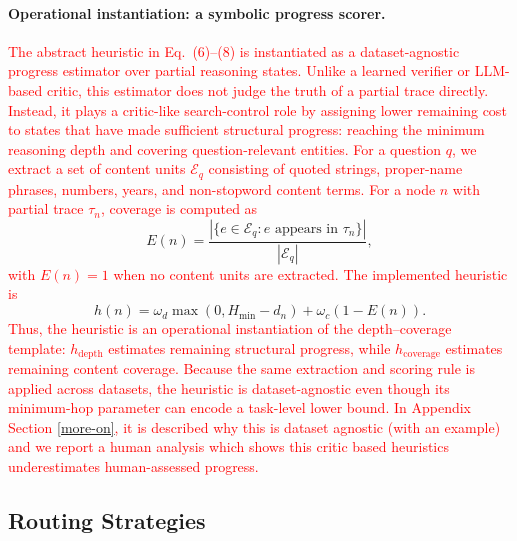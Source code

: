 \documentclass[11pt]{article}
\begin{document}
\paragraph{Operational instantiation: a symbolic progress scorer.}
\textcolor{red}{The abstract heuristic in Eq.~(6)--(8) is instantiated as a}
\textcolor{red}{dataset-agnostic progress estimator over partial reasoning states. Unlike}
\textcolor{red}{a learned verifier or LLM-based critic, this estimator does not judge the}
\textcolor{red}{truth of a partial trace directly. Instead, it plays a critic-like}
\textcolor{red}{search-control role by assigning lower remaining cost to states that have}
\textcolor{red}{made sufficient structural progress: reaching the minimum reasoning depth}
\textcolor{red}{and covering question-relevant entities. For a question \(q\), we extract}
\textcolor{red}{a set of content units \(\mathcal{E}_q\) consisting of quoted strings,}
\textcolor{red}{proper-name phrases, numbers, years, and non-stopword content terms. For}
\textcolor{red}{a node \(n\) with partial trace \(\tau_n\), coverage is computed as}
\[
E(n)=
\frac{|\{e\in\mathcal{E}_q: e \text{ appears in } \tau_n\}|}
{|\mathcal{E}_q|},
\]
\textcolor{red}{with \(E(n)=1\) when no content units are extracted. The implemented}
\textcolor{red}{heuristic is}
\[
h(n)
=
\omega_d\max(0,H_{\min}-d_n)
+
\omega_c(1-E(n)).
\]
\textcolor{red}{Thus, the heuristic is an operational instantiation of the}
\textcolor{red}{depth--coverage template: \(h_{\mathrm{depth}}\) estimates remaining}
\textcolor{red}{structural progress, while \(h_{\mathrm{coverage}}\) estimates remaining}
\textcolor{red}{content coverage. Because the same extraction and scoring rule is applied}
\textcolor{red}{across datasets, the heuristic is dataset-agnostic even though its}
\textcolor{red}{minimum-hop parameter can encode a task-level lower bound. In Appendix Section \ref{more-on}, it is described why this is dataset agnostic (with an example) and we report a human analysis which shows this critic based heuristics underestimates human-assessed progress.}





\subsection{Routing Strategies}
\label{sec:routing}
\end{document}
